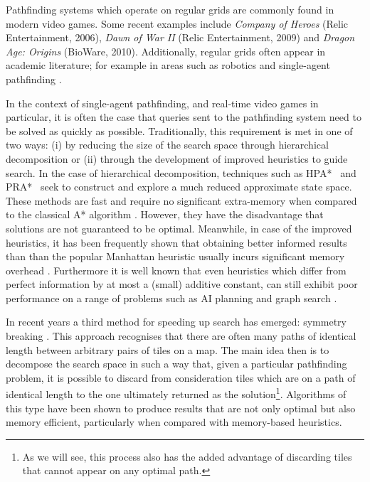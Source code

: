 Pathfinding systems which operate on regular grids are commonly found in modern video games.
Some recent examples include \emph{Company of Heroes} (Relic Entertainment, 2006), \emph{Dawn of War II} (Relic
Entertainment, 2009) and \emph{Dragon Age: Origins} (BioWare, 2010).
Additionally, regular grids often appear in academic literature; for example in areas such as robotics \cite{latombe92} and
single-agent pathfinding \cite{yap02,botea04,sturtevant07,harabor10}.
\par
In the context of single-agent pathfinding, and real-time video games in particular, it is often the case that queries sent to
the pathfinding system  need to be solved as quickly as possible.
Traditionally, this requirement is met in one of two ways: (i) by reducing the size of the search space through hierarchical 
decomposition or (ii) through the development of improved heuristics to guide search.
In the case of hierarchical decomposition, techniques such as
HPA*~\cite{botea04} and PRA*~\cite{sturtevant05} seek to construct and explore
a much reduced approximate state space.
These methods are fast and require no significant extra-memory when compared to the classical
A* algorithm \cite{hart68}.
However, they have the disadvantage that solutions are not guaranteed to be optimal.
Meanwhile, in case of the improved heuristics, it has been frequently shown
that obtaining better informed results than than the popular
Manhattan heuristic usually incurs significant memory overhead 
\cite{sturtevant09,goldberg05,Cazenave:06,bjornsson06}.
Furthermore it is well known that even heuristics which differ from perfect information 
by at most a (small) additive constant, can still exhibit poor performance on a range of 
problems such as AI planning and graph search \cite{helmert08,pohl77}.
\par
In recent years a third method for speeding up search has emerged: symmetry breaking \cite{pochter10,harabor10}.
This approach recognises that there are often many paths of identical length between arbitrary pairs of tiles on a map.
The main idea then is to decompose the search space in such a way that, given a particular pathfinding problem, it is possible to
discard from consideration tiles which are on a path of identical length to the one ultimately returned as the solution\footnote{
As we will see, this process also has the added advantage of discarding tiles 
that cannot appear on any optimal path.}.
Algorithms of this type have been  shown to produce results that are not only optimal but also memory efficient, 
particularly when compared with memory-based heuristics.
